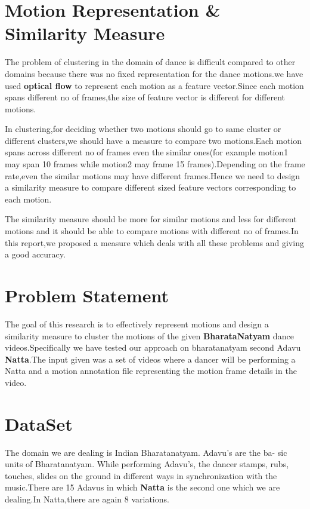 \section{Motion Representation \& Similarity Measure}

The problem of clustering in the domain of dance is difficult compared to other domains because there was no fixed representation for the dance motions.we have used \textbf{optical flow} to represent each motion as a feature vector.Since each motion spans different no of frames,the size of feature vector is different for different motions.

In clustering,for deciding whether two motions should go to same cluster or different clusters,we should have a measure to compare two motions.Each motion spans across different no of frames even the similar ones(for example motion1 may span 10 frames while motion2 may frame 15 frames).Depending on the frame rate,even the similar motions may have different frames.Hence we need to design a similarity measure to compare different sized feature vectors corresponding to each motion.

The similarity measure should be more for similar motions and less for different motions and it should be able to compare motions with different no of frames.In this report,we proposed a measure which deals with all these problems and giving a good accuracy.






\section{Problem Statement}

The goal of this research is to effectively represent motions and design a similarity measure to cluster the motions of the given \textbf{BharataNatyam} dance videos.Specifically we have tested our approach on bharatanatyam second Adavu \textbf{Natta}.The input given was a set of videos where a dancer will be performing a Natta and a motion annotation file representing the motion frame details in the video.

\section{DataSet}

The domain we are dealing is Indian Bharatanatyam. Adavu’s are the ba-
sic units of Bharatanatyam. While performing Adavu’s, the dancer stamps,
rubs, touches, slides on the ground in different ways in synchronization with the music.There are 15 Adavus in which \textbf{Natta} is the second one which we are dealing.In Natta,there are again 8 variations.

